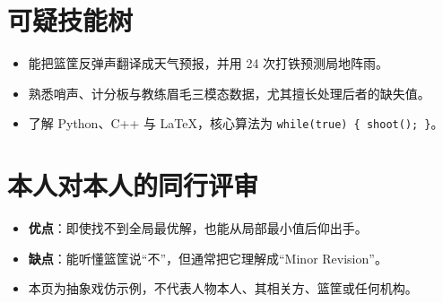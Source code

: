 \documentclass[11pt]{article}
\newlength{\iconwidth}
\begin{document}
    \begin{minipage}[t]{\textwidth}
    \section[可疑技能树]{\makebox[\iconwidth][c]{\color{primary_color}{\faWrench}}\quad 可疑技能树}
    \begin{itemize}
        \setlength{\itemsep}{0.25em}
        \item 能把篮筐反弹声翻译成天气预报，并用 24 次打铁预测局地阵雨。
        \item 熟悉哨声、计分板与教练眉毛三模态数据，尤其擅长处理后者的缺失值。
        \item 了解 Python、C++ 与 \LaTeX，核心算法为 \texttt{while(true) \{ shoot(); \}}。
    \end{itemize}
    \vspace{0.25em}
    \end{minipage}

    \begin{minipage}[t]{\textwidth}
    \section[本人对本人的同行评审]{\makebox[\iconwidth][c]{\color{primary_color}{\faStar}}\quad 本人对本人的同行评审}
    \begin{itemize}
        \item \textbf{优点}：即使找不到全局最优解，也能从局部最小值后仰出手。
        \item \textbf{缺点}：能听懂篮筐说“不”，但通常把它理解成“Minor Revision”。
        \item 本页为抽象戏仿示例，不代表人物本人、其相关方、篮筐或任何机构。
    \end{itemize}
    \end{minipage}
\end{document}
